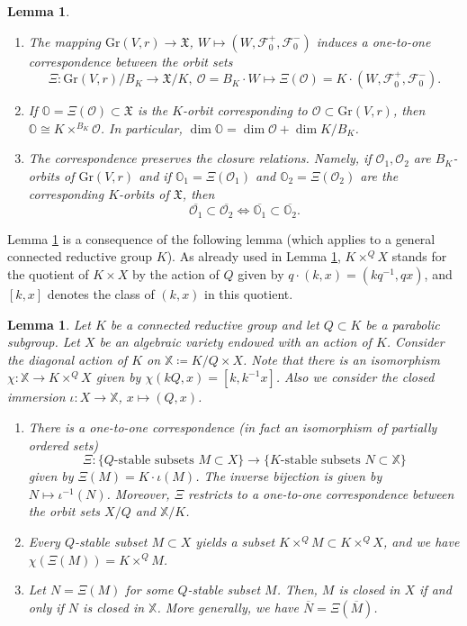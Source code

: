 \documentclass[11pt]{article}
\newtheorem{lemma}[theo]{Lemma}
\theoremstyle{definition}
\numberwithin{equation}{section}
\newcommand{\flag}{\mathcal{F}}
\newcommand{\Xorbit}{\mathbb{O}}
\newcommand{\Gorbit}{\mathcal{O}}
\newcommand{\Xfv}{\mathfrak{X}}
\newcommand{\Grass}{\mathrm{Gr}}
\begin{document}
\begin{lemma}
\label{L3.1}
\begin{enumerate}
\item The mapping $\Grass(V,r)\to\Xfv$, $W\mapsto (W,\flag_0^+,\flag_0^-)$ induces a one-to-one correspondence between the orbit sets
\[\Xi:\Grass(V,r)/B_K\to \Xfv/K,\ \Gorbit=B_K\cdot W\mapsto \Xi(\Gorbit)=K\cdot (W,\flag_0^+,\flag_0^-).\]
\item If $\Xorbit=\Xi(\Gorbit)\subset\Xfv$ is the $K$-orbit corresponding to $\Gorbit\subset\Grass(V,r)$, then $\Xorbit\cong K\times^{B_K}\Gorbit$. In particular, $\dim\Xorbit=\dim\Gorbit+\dim K/B_K$.
\item The correspondence preserves the closure relations. Namely, if $\Gorbit_1,\Gorbit_2$ are $B_K$-orbits of $\Grass(V,r)$ and if $\Xorbit_1=\Xi(\Gorbit_1)$ and $\Xorbit_2=\Xi(\Gorbit_2)$ are the corresponding $K$-orbits of $\Xfv$, then
\[\overline{\Gorbit_1}\subset\overline{\Gorbit_2}\iff \overline{\Xorbit_1}\subset\overline{\Xorbit_2}.\]
\end{enumerate}
\end{lemma}

Lemma \ref{L3.1} is a consequence of the following lemma (which applies to a general connected reductive group $K$).
As already used in Lemma \ref{L3.1}, $K\times^QX$ stands for the quotient of $K\times X$ by the action of $Q$ given by $q\cdot(k,x)=(kq^{-1},qx)$, and $[k,x]$ denotes the class of $(k,x)$ in this quotient. %

\begin{lemma}
\label{L3.2-new}
Let $K$ be a connected reductive group and let $Q\subset K$ be a parabolic subgroup. Let $X$ be an algebraic variety endowed with an action of $K$. Consider the diagonal action of $K$ on $\mathbb{X}\coloneqq K/Q\times X$.
Note that there is an isomorphism  $\chi:\mathbb{X}\to K\times^QX$ given by $\chi(kQ,x)=[k,k^{-1}x]$.
Also we consider the closed immersion $\iota:X\to\mathbb{X}$, $x\mapsto(Q,x)$.
\begin{enumerate}
\item There is a one-to-one correspondence (in fact an isomorphism of partially ordered sets)
\[\Xi:\{\mbox{$Q$-stable subsets $M\subset X$}\}\to\{\mbox{$K$-stable subsets $N\subset\mathbb{X}$}\}\]
given by $\Xi(M)=K\cdot\iota(M)$. The inverse bijection is given by $N\mapsto\iota^{-1}(N)$. Moreover, $\Xi$ restricts to a one-to-one correspondence between the orbit sets $X/Q$ and $\mathbb{X}/K$.
\item Every $Q$-stable subset $M\subset X$ yields a subset $K\times^QM\subset K\times^QX$, and we have $\chi(\Xi(M))=K\times^QM$.
\item Let $N=\Xi(M)$ for some $Q$-stable subset $M$. Then, $M$ is closed in $X$ if and only if $N$ is closed in $\mathbb{X}$. More generally, we have $\overline{N}=\Xi(\overline{M})$.
\end{enumerate}
\end{lemma}
\end{document}

